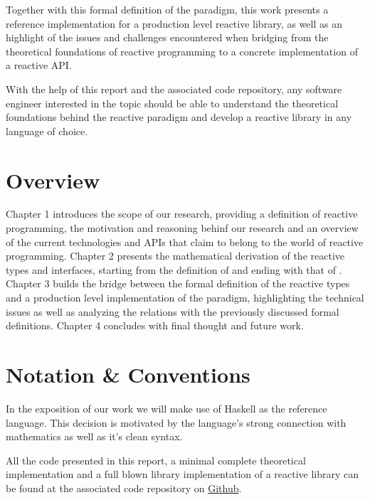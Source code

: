 Together with this formal definition of the paradigm, this work presents a reference implementation for a production level reactive library, as well as an highlight of the issues and challenges encountered when bridging from the theoretical foundations of reactive programming to a concrete implementation of a reactive API. 

With the help of this report and the associated code repository, any software engineer interested in the topic should be able to understand the theoretical foundations behind the reactive paradigm and develop a reactive library in any language of choice.

\section*{Overview}

Chapter 1 introduces the scope of our research, providing a definition of reactive programming, the motivation and reasoning behinf our research and an overview of the current technologies and APIs that claim to belong to the world of reactive programming. Chapter 2 presents the mathematical derivation of the reactive types and interfaces, starting from the definition of  and ending with that of . Chapter 3 builds the bridge between the formal definition of the reactive types and a production level implementation of the paradigm, highlighting the technical issues as well as analyzing the relations with the previously discussed formal definitions. Chapter 4 concludes with final thought and future work.

\section*{Notation \& Conventions}

In the exposition of our work we will make use of Haskell as the reference language. This decision is motivated by the language's strong connection with mathematics as well as it's clean syntax.

All the code presented in this report, a minimal complete theoretical implementation and a full blown library implementation of a reactive library can be found at the associated code repository on \href{https://github.com/Widar91/Thesis/tree/master/reactive-formalism/rx-hs}{Github}. 
